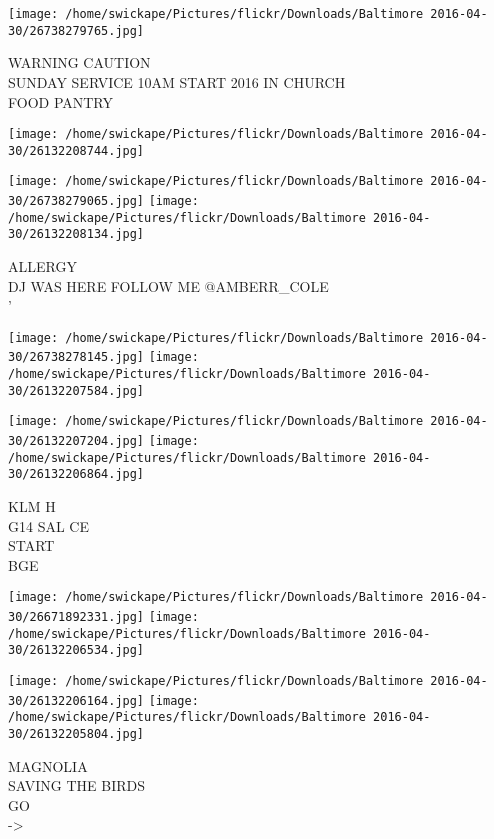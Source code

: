 \documentclass[10pt,letterpaper]{article}
\begin{document}
\texttt{[image: /home/swickape/Pictures/flickr/Downloads/Baltimore 2016-04-30/26738279765.jpg]}

WARNING CAUTION\\
SUNDAY SERVICE 10AM START 2016 IN CHURCH\\
FOOD PANTRY\\
\pagebreak

\texttt{[image: /home/swickape/Pictures/flickr/Downloads/Baltimore 2016-04-30/26132208744.jpg]}

\vspace{0.25in}
\texttt{[image: /home/swickape/Pictures/flickr/Downloads/Baltimore 2016-04-30/26738279065.jpg]}
\texttt{[image: /home/swickape/Pictures/flickr/Downloads/Baltimore 2016-04-30/26132208134.jpg]}

ALLERGY\\
DJ WAS HERE FOLLOW ME @AMBERR\_COLE\\
'\\
\pagebreak

\texttt{[image: /home/swickape/Pictures/flickr/Downloads/Baltimore 2016-04-30/26738278145.jpg]}
\texttt{[image: /home/swickape/Pictures/flickr/Downloads/Baltimore 2016-04-30/26132207584.jpg]}

\texttt{[image: /home/swickape/Pictures/flickr/Downloads/Baltimore 2016-04-30/26132207204.jpg]}
\texttt{[image: /home/swickape/Pictures/flickr/Downloads/Baltimore 2016-04-30/26132206864.jpg]}

KLM H\\
G14 SAL CE\\
START\\
BGE\\
\pagebreak

\texttt{[image: /home/swickape/Pictures/flickr/Downloads/Baltimore 2016-04-30/26671892331.jpg]}
\texttt{[image: /home/swickape/Pictures/flickr/Downloads/Baltimore 2016-04-30/26132206534.jpg]}

\texttt{[image: /home/swickape/Pictures/flickr/Downloads/Baltimore 2016-04-30/26132206164.jpg]}
\texttt{[image: /home/swickape/Pictures/flickr/Downloads/Baltimore 2016-04-30/26132205804.jpg]}

MAGNOLIA\\
SAVING THE BIRDS\\
GO\\
{-}>\\
\pagebreak
\end{document}
